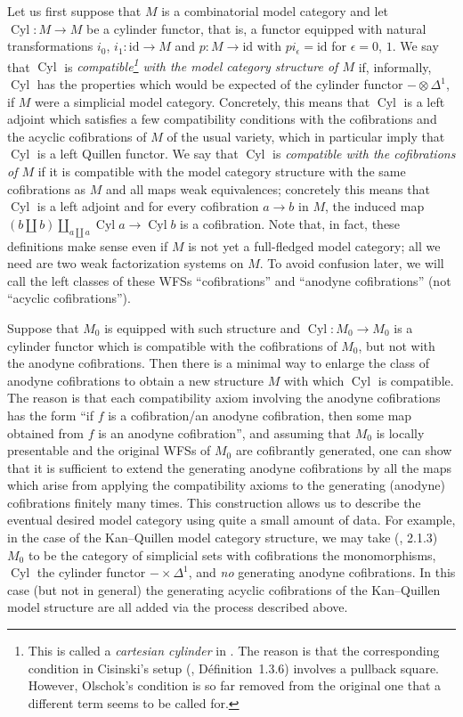 \documentclass{article}
\theoremstyle{definition}
\theoremstyle{plain}
\newcommand{\KQ}{Kan--Quillen}
\newcommand{\id}{\mathrm{id}}
\DeclareMathOperator{\Cyl}{Cyl}
\begin{document}
Let us first suppose that $M$ is a combinatorial model category and let $\Cyl : M \to M$ be a cylinder functor, that is, a functor equipped with natural transformations $i_0$, $i_1 : \id \to M$ and $p : M \to \id$ with $pi_\epsilon = \id$ for $\epsilon = 0$, $1$.
We say that $\Cyl$ is \emph{compatible\footnote{
    This is called a \emph{cartesian cylinder} in \cite{O}.
    The reason is that the corresponding condition in Cisinski's setup (\cite{C06}, D\'efinition~1.3.6) involves a pullback square.
    However, Olschok's condition is so far removed from the original one that a different term seems to be called for.
  }
with the model category structure of $M$} if, informally, $\Cyl$ has the properties which would be expected of the cylinder functor $- \otimes \Delta^1$, if $M$ were a simplicial model category.
Concretely, this means that $\Cyl$ is a left adjoint which satisfies a few compatibility conditions with the cofibrations and the acyclic cofibrations of $M$ of the usual variety, which in particular imply that $\Cyl$ is a left Quillen functor.
We say that $\Cyl$ is \emph{compatible with the cofibrations of $M$} if it is compatible with the model category structure with the same cofibrations as $M$ and all maps weak equivalences; concretely this means that $\Cyl$ is a left adjoint and for every cofibration $a \to b$ in $M$, the induced map $(b \amalg b) \amalg_{a \amalg a} \Cyl a \to \Cyl b$ is a cofibration.
Note that, in fact, these definitions make sense even if $M$ is not yet a full-fledged model category; all we need are two weak factorization systems on $M$.
To avoid confusion later, we will call the left classes of these WFSs ``cofibrations'' and ``anodyne cofibrations'' (not ``acyclic cofibrations'').

Suppose that $M_0$ is equipped with such structure and $\Cyl : M_0 \to M_0$ is a cylinder functor which is compatible with the cofibrations of $M_0$, but not with the anodyne cofibrations.
Then there is a minimal way to enlarge the class of anodyne cofibrations to obtain a new structure $M$ with which $\Cyl$ is compatible.
The reason is that each compatibility axiom involving the anodyne cofibrations has the form ``if $f$ is a cofibration/an anodyne cofibration, then some map obtained from $f$ is an anodyne cofibration'', and assuming that $M_0$ is locally presentable and the original WFSs of $M_0$ are cofibrantly generated, one can show that it is sufficient to extend the generating anodyne cofibrations by all the maps which arise from applying the compatibility axioms to the generating (anodyne) cofibrations finitely many times.
This construction allows us to describe the eventual desired model category using quite a small amount of data.
For example, in the case of the \KQ{} model category structure, we may take (\cite{C06}, 2.1.3) $M_0$ to be the category of simplicial sets with cofibrations the monomorphisms, $\Cyl$ the cylinder functor $- \times \Delta^1$, and \emph{no} generating anodyne cofibrations.
In this case (but not in general) the generating acyclic cofibrations of the \KQ{} model structure are all added via the process described above.
\end{document}
